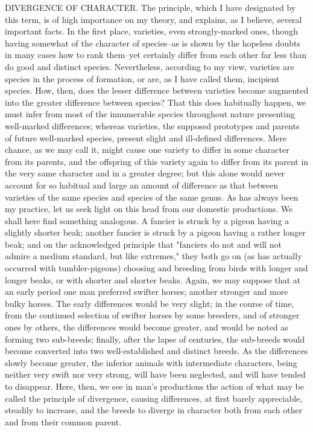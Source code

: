 DIVERGENCE OF CHARACTER.
The principle, which I have designated by this term, is of high importance on my theory, and explains, as I believe, several important facts. In the first place, varieties, even strongly-marked ones, though having somewhat of the character of species--as is shown by the hopeless doubts in many cases how to rank them--yet certainly differ from each other far less than do good and distinct species. Nevertheless, according to my view, varieties are species in the process of formation, or are, as I have called them, incipient species. How, then, does the lesser difference between varieties become augmented into the greater difference between species? That this does habitually happen, we must infer from most of the innumerable species throughout nature presenting well-marked differences; whereas varieties, the supposed prototypes and parents of future well-marked species, present slight and ill-defined differences. Mere chance, as we may call it, might cause one variety to differ in some character from its parents, and the offspring of this variety again to differ from its parent in the very same character and in a greater degree; but this alone would never account for so habitual and large an amount of difference as that between varieties of the same species and species of the same genus.
As has always been my practice, let us seek light on this head from our domestic productions. We shall here find something analogous. A fancier is struck by a pigeon having a slightly shorter beak; another fancier is struck by a pigeon having a rather longer beak; and on the acknowledged principle that "fanciers do not and will not admire a medium standard, but like extremes," they both go on (as has actually occurred with tumbler-pigeons) choosing and breeding from birds with longer and longer beaks, or with shorter and shorter beaks. Again, we may suppose that at an early period one man preferred swifter horses; another stronger and more bulky horses. The early differences would be very slight; in the course of time, from the continued selection of swifter horses by some breeders, and of stronger ones by others, the differences would become greater, and would be noted as forming two sub-breeds; finally, after the lapse of centuries, the sub-breeds would become converted into two well-established and distinct breeds. As the differences slowly become greater, the inferior animals with intermediate characters, being neither very swift nor very strong, will have been neglected, and will have tended to disappear. Here, then, we see in man's productions the action of what may be called the principle of divergence, causing differences, at first barely appreciable, steadily to increase, and the breeds to diverge in character both from each other and from their common parent.
